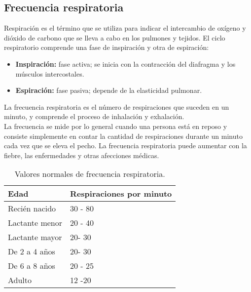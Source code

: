 	\subsection{Frecuencia respiratoria}
	Respiración es el término que se utiliza para indicar el intercambio de oxígeno y dióxido de carbono que se lleva a cabo en los pulmones y tejidos. \cite{cobo2011} El ciclo respiratorio comprende una fase de inspiración y otra de espiración:
	\begin{itemize}
		\item \textbf{Inspiración:} fase activa; se inicia con la contracción del diafragma y los músculos intercostales.
		\item \textbf{Espiración:} fase pasiva; depende de la elasticidad pulmonar.
	\end{itemize}
	
	La frecuencia respiratoria es el número de respiraciones que suceden en un minuto, y comprende el proceso de inhalación y exhalación. \cite{aguayoChile}\\
	
	La frecuencia se mide por lo general cuando una persona está en reposo y consiste simplemente en contar la cantidad de respiraciones durante un minuto cada vez que se eleva el pecho. La frecuencia respiratoria puede aumentar con la fiebre, las enfermedades y otras afecciones médicas. \cite{valoresUNAM}
	
	\begin{table}[htbp]
		\begin{center}
			\begin{tabular}{|l|l|}
				\hline
				\textbf{Edad} & \textbf{Respiraciones por minuto} \\
				\hline \hline
				Recién nacido & 30 - 80  \\
				\hline
				Lactante menor & 20 - 40  \\
				\hline
				Lactante mayor & 20- 30  \\
				\hline
				De 2 a 4 años & 20- 30  \\
				\hline
				De 6 a 8 años & 20 - 25  \\
				\hline
				Adulto & 12 -20  \\
				\hline
			\end{tabular}
			\caption{Valores normales de frecuencia respiratoria.}
		\end{center}
	\end{table}
	
